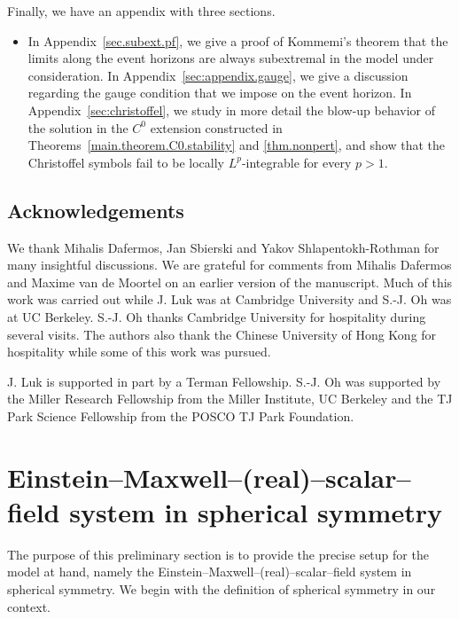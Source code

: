 \documentclass[10pt, reqno]{amsart}
\theoremstyle{definition}
\theoremstyle{remark}
\numberwithin{equation}{section}
\newcommand{\0}{\emptyset}
\begin{document}
Finally, we have an appendix with three sections.
\begin{itemize}
\item In Appendix~\ref{sec.subext.pf}, we give a proof of Kommemi's theorem that the limits along the event horizons are always subextremal in the model under consideration. In Appendix~\ref{sec:appendix.gauge}, we give a discussion regarding the gauge condition that we impose on the event horizon. In Appendix~\ref{sec:christoffel}, we study in more detail the blow-up behavior of the solution in the $C^{0}$ extension constructed in Theorems~\ref{main.theorem.C0.stability} and \ref{thm.nonpert}, and show that the Christoffel symbols fail to be locally $L^{p}$-integrable for every $p > 1$.
\end{itemize}


\subsection*{Acknowledgements} We thank Mihalis Dafermos, Jan Sbierski and Yakov Shlapentokh-Rothman for many insightful discussions. We are grateful for comments from Mihalis Dafermos and Maxime van de Moortel on an earlier version of the manuscript. Much of this work was carried out while J. Luk was at Cambridge University and S.-J. Oh was at UC Berkeley. S.-J. Oh thanks Cambridge University for hospitality during several visits. The authors also thank the Chinese University of Hong Kong for hospitality while some of this work was pursued.

J. Luk is supported in part by a Terman Fellowship. S.-J. Oh was supported by the Miller Research Fellowship from the Miller Institute, UC Berkeley and the TJ Park Science Fellowship from the POSCO TJ Park Foundation.

\section{Einstein--Maxwell--(real)--scalar--field system in spherical symmetry}\label{sec.SS}
The purpose of this preliminary section is to provide the precise setup for the model at hand, namely the Einstein--Maxwell--(real)--scalar--field system in spherical symmetry. We begin with the definition of spherical symmetry in our context.
\end{document}
